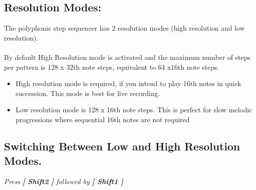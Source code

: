 \subsection{Resolution Modes:}
The polyphonic step sequencer has 2 resolution modes (high resolution and low resolution).\\
\\
By default High Resolution mode is activated and the maximum number of steps per pattern is 128 x 32th note steps, equivalent to 64 x16th note steps.
\begin{itemize}
\item High resolution mode is required, if you intend to play 16th notes in quick succession. This mode is best for live recording.
\item Low resolution mode is 128 x 16th note steps. This is perfect for slow melodic progressions where sequential 16th notes are not required
\end{itemize}
\subsection{Switching Between Low and High Resolution Modes.}
\textit{Press \textbf{[ Shift2 ]} followed by \textbf{[ Shift1 ]}}
